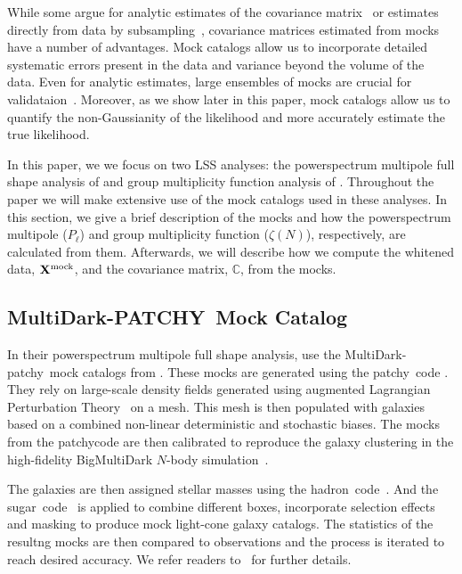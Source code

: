 \documentclass[12pt, letterpaper, preprint]{aastex}
\newcommand{\patchy}{{\fontshape\scdefault\selectfont patchy}}
\begin{document}
While some argue for analytic estimates of the covariance 
matrix~\citep[e.g.][]{mohammed2017} or estimates directly from data
by subsampling~\citep[e.g.][]{norberg2009}, covariance matrices 
estimated from mocks have a number of advantages. Mock catalogs
allow us to incorporate detailed systematic errors present in the 
data and variance beyond the volume of the data. Even for analytic 
estimates, large ensembles of mocks are crucial for validataion~\citep{slepian2017}. 
Moreover, as we show later in this paper, mock catalogs allow us to 
quantify the non-Gaussianity of the likelihood and more accurately 
estimate the true likelihood. 

In this paper, we we focus on two LSS analyses: the powerspectrum 
multipole full shape analysis of \cite{beutler2017} and group multiplicity 
function analysis of \cite{sinha2017a}. Throughout the paper we will 
make extensive use of the mock catalogs used in these analyses. 
In this section, we give a brief description of the mocks and how 
the powerspectrum multipole ($P_\ell$) and group multiplicity function 
($\zeta(N)$), respectively, are calculated from them. Afterwards, we 
will describe how we compute the whitened data, ${\bf X}^\mathrm{mock}$, 
and the covariance matrix, $\mathbb{C}$, from the mocks.

\subsection{MultiDark-PATCHY~Mock Catalog} 
In their powerspectrum multipole full shape analysis, \cite{beutler2017}
use the MultiDark-\patchy~mock catalogs from \cite{kitaura2016}. 
These mocks are generated using the \patchy~code \citep{kitaura2014,kitaura2015}. 
They rely on large-scale density fields generated using augmented
Lagrangian Perturbation Theory~\citep[ALPT][]{kitaura2013} on a mesh.
This mesh is then populated with galaxies based on a combined non-linear
deterministic and stochastic biases. The mocks from the \patchy code 
are then calibrated to reproduce the galaxy clustering in the 
high-fidelity BigMultiDark $N$-body simulation~\citep{rodriguez-torres2016, klypin2016}. 

The galaxies are then assigned stellar masses using the 
{\fontshape\scdefault\selectfont hadron}~code~\citep{zhao2015}.
And the {\fontshape\scdefault\selectfont sugar}~code~\citep{rodriguez-torres2016} 
is applied to combine different boxes, incorporate selection
effects and masking to produce mock light-cone galaxy catalogs. 
The statistics of the resultng mocks are then compared to 
observations and the process is iterated to reach desired 
accuracy. We refer readers to~\cite{kitaura2016} for further 
details. 
\end{document}

